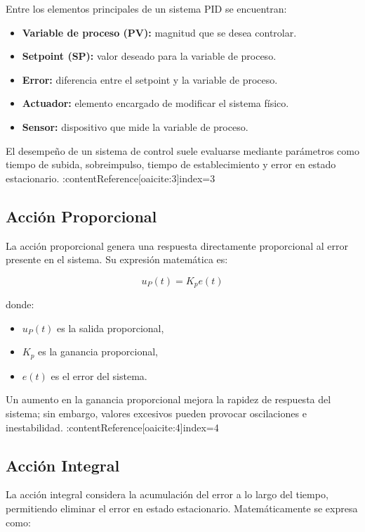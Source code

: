 \documentclass[journal, onecolumn]{IEEEtran}
\begin{document}
Entre los elementos principales de un sistema PID se encuentran:

\begin{itemize}
    \item \textbf{Variable de proceso (PV):} magnitud que se desea controlar.
    \item \textbf{Setpoint (SP):} valor deseado para la variable de proceso.
    \item \textbf{Error:} diferencia entre el setpoint y la variable de proceso.
    \item \textbf{Actuador:} elemento encargado de modificar el sistema físico.
    \item \textbf{Sensor:} dispositivo que mide la variable de proceso.
\end{itemize}

El desempeño de un sistema de control suele evaluarse mediante parámetros como tiempo de subida, sobreimpulso, tiempo de establecimiento y error en estado estacionario. :contentReference[oaicite:3]{index=3}

\subsection{Acción Proporcional}

La acción proporcional genera una respuesta directamente proporcional al error presente en el sistema. Su expresión matemática es:

\[
u_P(t)=K_p e(t)
\]

donde:

\begin{itemize}
    \item $u_P(t)$ es la salida proporcional,
    \item $K_p$ es la ganancia proporcional,
    \item $e(t)$ es el error del sistema.
\end{itemize}

Un aumento en la ganancia proporcional mejora la rapidez de respuesta del sistema; sin embargo, valores excesivos pueden provocar oscilaciones e inestabilidad. :contentReference[oaicite:4]{index=4}

\subsection{Acción Integral}

La acción integral considera la acumulación del error a lo largo del tiempo, permitiendo eliminar el error en estado estacionario. Matemáticamente se expresa como:
\end{document}
